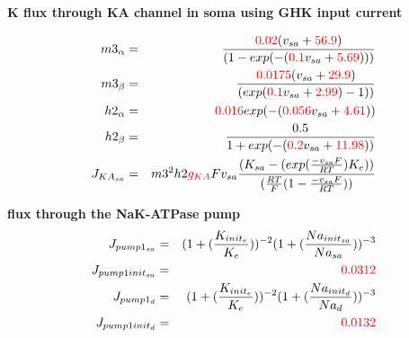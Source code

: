 \documentclass[fleqn]{report}
\numberwithin{equation}{section}
\numberwithin{equation}{section}
\begin{document}
 \textbf{K flux through KA channel in soma using GHK input current}

 \begin{eqnarray}
	            m3_{\alpha}     &=& \frac{\textcolor{red}{0.02} (v_{sa} + \textcolor{red}{56.9})}{(1 - exp(-(\textcolor{red}{0.1} v_{sa} + \textcolor{red}{5.69})))}\\
	            m3_{\beta}      &=& \frac{\textcolor{red}{0.0175}  (v_{sa} + \textcolor{red}{29.9})}{(exp(\textcolor{red}{0.1}  v_{sa} + \textcolor{red}{2.99}) - 1))}\\
	            h2_{\alpha}     &=& \textcolor{red}{0.016} exp(-(\textcolor{red}{0.056} v_{sa} + \textcolor{red}{4.61}))\\
	            h2_{\beta}      &=& \frac{0.5}{1 + exp(-(\textcolor{red}{0.2}  v_{sa} + \textcolor{red}{11.98}))}\\
	            J_{KA_{sa}}     &=& m3^2 h2 \textcolor{red}{g_{KA}} F v_{sa} \frac{(K_{sa} - (exp(\frac{-v_{sa} F}{RT})  K_e))}{(\frac{RT}{F} (1 - \frac{-v_{sa} F}{RT}))}\\
 \end{eqnarray}
	
	
	        \textbf{flux through the NaK-ATPase pump}
	        \begin{eqnarray}
	            J_{pump1_{sa}}      &=& (1 + (\frac{K_{init_{e}}}{K_e} ))^{-2} (1 + (\frac{Na_{init_{sa}}}{Na_{sa}} )) ^ {-3}\\
	            J_{pump1init_{sa}}  &=& \textcolor{red}{0.0312}\\ %
	            J_{pump1_{d}}       &=& (1 + (\frac{K_{init_{e}}}{K_e} ))^{-2} (1 + (\frac{Na_{init_{d}}}{Na_{d}} )) ^ {-3}\\
	            J_{pump1init_{d}}   &=&  \textcolor{red}{0.0132}\\  %
	        \end{eqnarray}

	            
%
\end{document}
